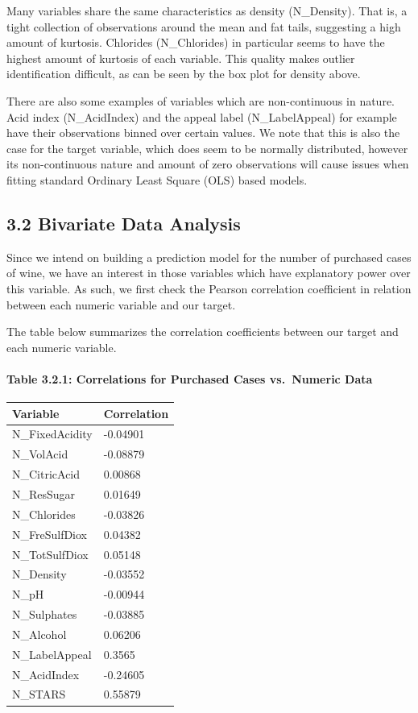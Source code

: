 \documentclass[]{article}
\let\oldparagraph\paragraph
\renewcommand{\paragraph}[1]{\oldparagraph{#1}\mbox{}}
\begin{document}
\newpage

Many variables share the same characteristics as density (N\_Density).
That is, a tight collection of observations around the mean and fat
tails, suggesting a high amount of kurtosis. Chlorides (N\_Chlorides) in
particular seems to have the highest amount of kurtosis of each
variable. This quality makes outlier identification difficult, as can be
seen by the box plot for density above.

There are also some examples of variables which are non-continuous in
nature. Acid index (N\_AcidIndex) and the appeal label (N\_LabelAppeal)
for example have their observations binned over certain values. We note
that this is also the case for the target variable, which does seem to
be normally distributed, however its non-continuous nature and amount of
zero observations will cause issues when fitting standard Ordinary Least
Square (OLS) based models.

\subsection{3.2 Bivariate Data Analysis}\label{bivariate-data-analysis}

Since we intend on building a prediction model for the number of
purchased cases of wine, we have an interest in those variables which
have explanatory power over this variable. As such, we first check the
Pearson correlation coefficient in relation between each numeric
variable and our target.

The table below summarizes the correlation coefficients between our
target and each numeric variable.

\paragraph{Table 3.2.1: Correlations for Purchased Cases vs.~Numeric
Data}\label{table-3.2.1-correlations-for-purchased-cases-vs.numeric-data}

\begin{longtable}[]{@{}ll@{}}
\toprule
Variable & Correlation\tabularnewline
\midrule
\endhead
N\_FixedAcidity & -0.04901\tabularnewline
N\_VolAcid & -0.08879\tabularnewline
N\_CitricAcid & 0.00868\tabularnewline
N\_ResSugar & 0.01649\tabularnewline
N\_Chlorides & -0.03826\tabularnewline
N\_FreSulfDiox & 0.04382\tabularnewline
N\_TotSulfDiox & 0.05148\tabularnewline
N\_Density & -0.03552\tabularnewline
N\_pH & -0.00944\tabularnewline
N\_Sulphates & -0.03885\tabularnewline
N\_Alcohol & 0.06206\tabularnewline
N\_LabelAppeal & 0.3565\tabularnewline
N\_AcidIndex & -0.24605\tabularnewline
N\_STARS & 0.55879\tabularnewline
\bottomrule
\end{longtable}
\end{document}
